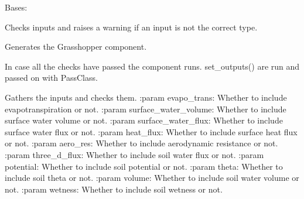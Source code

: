 \documentclass[letterpaper,10pt,english]{sphinxmanual}
\begin{document}
\begin{fulllineitems}
\label{\detokenize{cmf:livestock.components.comp_cmf.CMFOutputs}}
Bases: {\hyperref[\detokenize{superclass:livestock.components.component.GHComponent}]{}}

\begin{fulllineitems}
\label{\detokenize{cmf:livestock.components.comp_cmf.CMFOutputs.check_inputs}}
Checks inputs and raises a warning if an input is not the correct type.

\end{fulllineitems}


\begin{fulllineitems}
\label{\detokenize{cmf:livestock.components.comp_cmf.CMFOutputs.config}}
Generates the Grasshopper component.

\end{fulllineitems}


\begin{fulllineitems}
\label{\detokenize{cmf:livestock.components.comp_cmf.CMFOutputs.run}}
In case all the checks have passed the component runs.
set\_outputs() are run and passed on with PassClass.

\end{fulllineitems}


\begin{fulllineitems}
\label{\detokenize{cmf:livestock.components.comp_cmf.CMFOutputs.run_checks}}
Gathers the inputs and checks them.
:param evapo\_trans: Whether to include evapotranspiration or not.
:param surface\_water\_volume: Whether to include surface water volume or not.
:param surface\_water\_flux: Whether to include surface water flux or not.
:param heat\_flux: Whether to include surface heat flux or not.
:param aero\_res: Whether to include aerodynamic resistance or not.
:param three\_d\_flux: Whether to include soil water flux or not.
:param potential: Whether to include soil potential or not.
:param theta: Whether to include soil theta or not.
:param volume: Whether to include soil water volume or not.
:param wetness: Whether to include soil wetness or not.


\end{fulllineitems}
\end{fulllineitems}
\end{document}
